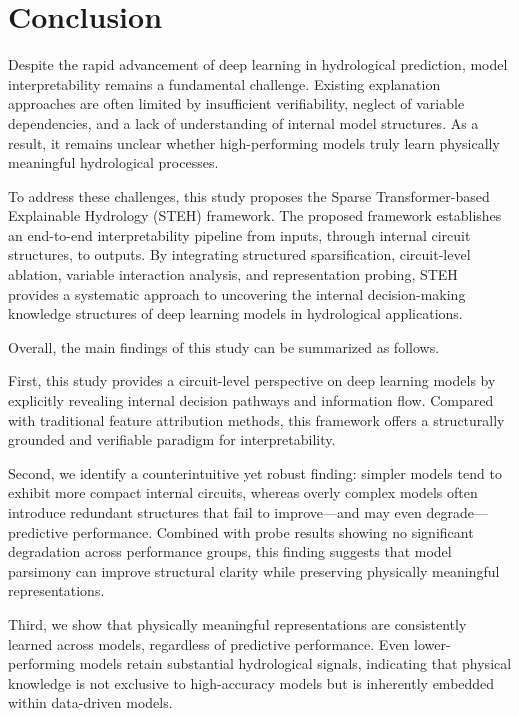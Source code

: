 \section{Conclusion}

Despite the rapid advancement of deep learning in hydrological prediction, model interpretability remains a fundamental challenge. Existing explanation approaches are often limited by insufficient verifiability, neglect of variable dependencies\cite{e24050687_Shap_problem}, and a lack of understanding of internal model structures\cite{kumar2020_Shap_problem}. As a result, it remains unclear whether high-performing models truly learn physically meaningful hydrological processes\cite{ReviewOfXAI}.

To address these challenges, this study proposes the Sparse Transformer-based\cite{openai_weight_sparse_transformers} Explainable Hydrology (STEH) framework. The proposed framework establishes an end-to-end interpretability pipeline from inputs, through internal circuit structures, to outputs. By integrating structured sparsification, circuit-level ablation, variable interaction analysis\cite{wang2022interpretabilitywildcircuitindirect}, and representation probing, STEH provides a systematic approach to uncovering the internal decision-making knowledge structures of deep learning models in hydrological applications.

Overall, the main findings of this study can be summarized as follows.

First, this study provides a circuit-level perspective on deep learning models by explicitly revealing internal decision pathways and information flow. Compared with traditional feature attribution methods, this framework offers a structurally grounded and verifiable paradigm for interpretability.

Second, we identify a counterintuitive yet robust finding: simpler models tend to exhibit more compact internal circuits, whereas overly complex models often introduce redundant structures that fail to improve—and may even degrade—predictive performance. Combined with probe results showing no significant degradation across performance groups, this finding suggests that model parsimony can improve structural clarity while preserving physically meaningful representations.

Third, we show that physically meaningful representations are consistently learned across models, regardless of predictive performance. Even lower-performing models retain substantial hydrological signals, indicating that physical knowledge is not exclusive to high-accuracy models but is inherently embedded within data-driven models.

